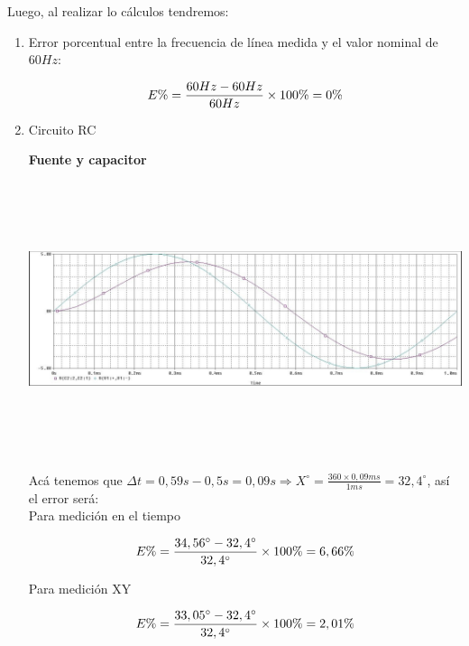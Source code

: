 \documentclass[12pt]{article}
\begin{document}
	\noindent Luego, al realizar lo cálculos tendremos:
	
	\renewcommand{\theenumi}{\alph{enumi}} %
	
	\begin{enumerate}
		\item Error porcentual entre la frecuencia de línea medida y el valor nominal de $60Hz$:
		
		\begin{equation}
			\notag E\% = \frac{60Hz - 60Hz}{60Hz}\times 100\% = 0\%
		\end{equation}
		
		\item Circuito RC
		
		\noindent \textbf{Fuente y capacitor}
		
		\begin{center}
			\includegraphics[width=16cm,height=8cm]{Img/spice_c_source}
		\end{center}
		
		\noindent Acá tenemos que $\Delta t = 0,59s - 0,5s = 0,09s\Rightarrow X^\circ = \frac{360 \times 0,09ms}{1ms} = 32,4^\circ$, así el error será:\\
		
		\noindent Para medición en el tiempo
		
		\begin{equation}
			\notag E\% = \frac{34,56^\circ - 32,4^\circ}{32,4^\circ}\times 100\% = 6,66\%
		\end{equation}
		
		\noindent Para medición XY
		
		\begin{equation}
			\notag E\% = \frac{33,05^\circ - 32,4^\circ}{32,4^\circ}\times 100\% = 2,01\%
		\end{equation}
		

\end{enumerate}
\end{document}

